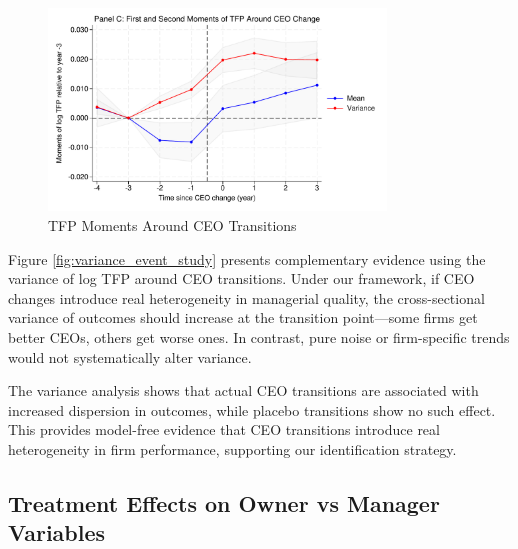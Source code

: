 \documentclass[11pt,a4paper]{article}
\begin{document}
\begin{figure}[htbp]
\centering
\includegraphics[width=0.8\textwidth]{figure/event_study_panel_c.pdf}
\caption{TFP Moments Around CEO Transitions}
\label{fig:intangibles}
\end{figure}

Figure \ref{fig:variance_event_study} presents complementary evidence using the variance of log TFP around CEO transitions. Under our framework, if CEO changes introduce real heterogeneity in managerial quality, the cross-sectional variance of outcomes should increase at the transition point—some firms get better CEOs, others get worse ones. In contrast, pure noise or firm-specific trends would not systematically alter variance.

The variance analysis shows that actual CEO transitions are associated with increased dispersion in outcomes, while placebo transitions show no such effect. This provides model-free evidence that CEO transitions introduce real heterogeneity in firm performance, supporting our identification strategy.


\subsection{Treatment Effects on Owner vs Manager Variables}




\end{document}
